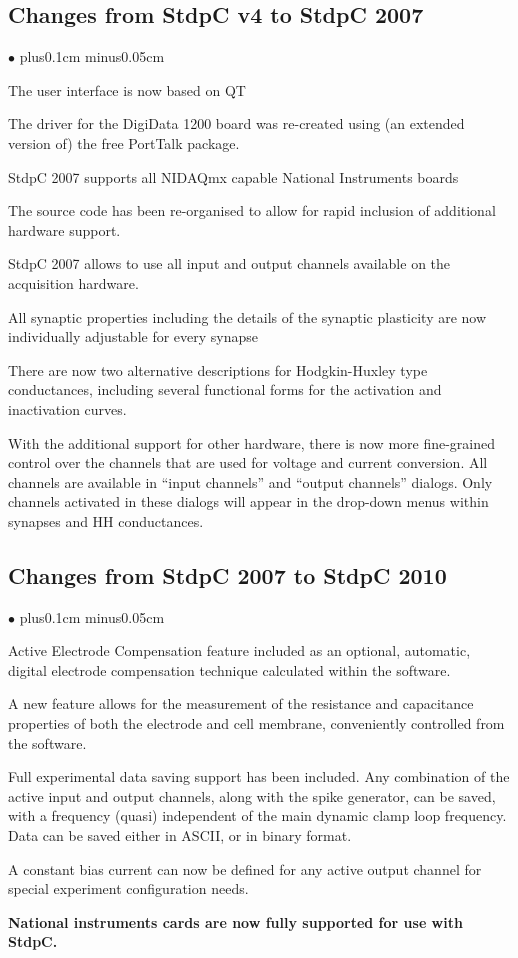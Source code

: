 \documentclass{article}
\newenvironment{myitem}{\begin{list}{$\bullet$}{\setlength{\leftmargin}{1.1em}
\itemsep0.1cm plus0.1cm minus0.05cm
\listparindent0cm
\addtolength{\labelsep}{0.5\labelsep}
\setlength{\labelwidth}{0.8em}
\setlength{\leftmargin}{\labelwidth}
\addtolength{\leftmargin}{\labelsep}
}}{\end{list}}
\begin{document}
\subsection{Changes from StdpC v4 to StdpC 2007}
\begin{myitem}
\item The user interface is now based on QT
\item The driver for the DigiData 1200 board was re-created using (an
  extended version of) the free PortTalk package.
\item StdpC 2007 supports all NIDAQmx capable National Instruments boards
\item The source code has been re-organised to allow for rapid
  inclusion of additional hardware support.
\item StdpC 2007 allows to use all input and output channels available
  on the acquisition hardware.
\item All synaptic properties including the details of the synaptic
  plasticity are now individually adjustable for every synapse
\item There are now two alternative descriptions for Hodgkin-Huxley
  type conductances, including several functional forms for the
  activation and inactivation curves.
\item With the additional support for other hardware, there is now
  more fine-grained control over the channels that are used for
  voltage and current conversion. All channels are available in
  ``input channels'' and ``output channels'' dialogs. Only channels
  activated in these dialogs will appear in the drop-down menus within
  synapses and HH conductances.
\end{myitem}

\subsection{Changes from StdpC 2007 to StdpC 2010}
\begin{myitem}
\item Active Electrode Compensation feature included as an optional,
  automatic, digital electrode compensation technique calculated within the
  software.                  
\item A new feature allows for the measurement of the resistance and
  capacitance properties of both the electrode and cell membrane,
  conveniently controlled from the software.  
\item Full experimental data saving support has been included. Any
  combination of the active input and output channels, along with the spike generator, can
  be saved, with a frequency (quasi) independent of the main dynamic clamp
  loop frequency. Data can be saved either in ASCII, or in binary format.
\item A constant bias current can now be defined for any active output
  channel for special experiment configuration needs. 
\item {\bf National instruments cards are now fully supported for use with StdpC.}
\end{myitem}
\end{document}
